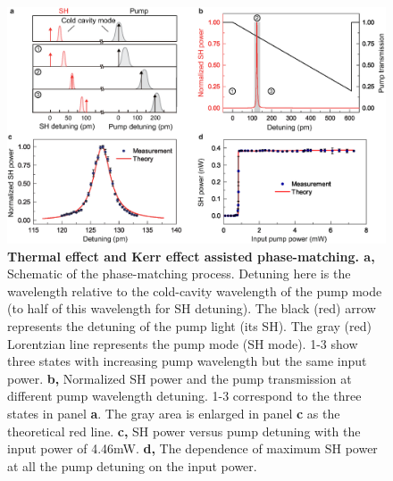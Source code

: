 \documentclass[a4paper,8pt,hyperref, twocolumn]{article}
\begin{document}
\begin{figure}[!ht]
\centering
\includegraphics[width=17cm]{try_ed3.eps}
\caption{\textbf{Thermal effect and Kerr effect assisted phase-matching. a, }Schematic of the phase-matching process. Detuning here is the wavelength relative to the cold-cavity wavelength of the pump mode (to half of this wavelength for SH detuning). The black (red) arrow represents the detuning of the pump light (its SH). The gray (red) Lorentzian line represents the pump mode (SH mode). 1-3 show three states with increasing pump wavelength but the same input power. \textbf{b, }Normalized SH power and the pump transmission at different pump wavelength detuning. 1-3 correspond to the three states in panel \textbf{a}. The gray area is enlarged in panel \textbf{c} as the theoretical red line. \textbf{c, }SH power versus pump detuning with the input power of 4.46mW. \textbf{d, }The dependence of maximum SH power at all the pump detuning on the input power.}
\label{pic:Fig2}
\end{figure}
\end{document}
